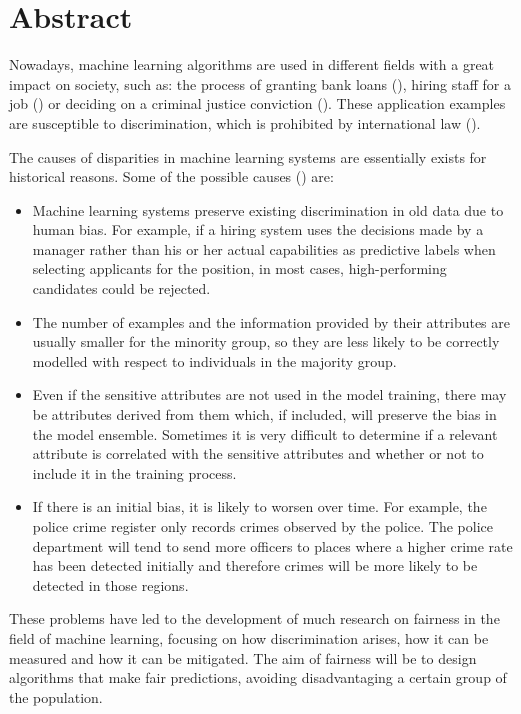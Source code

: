 \chapter*{Abstract}

Nowadays, machine learning algorithms are used in different fields with a great impact on society, such as: the process of granting bank loans (\cite{prestamo2018}), hiring staff for a job (\cite{contratar2015}) or deciding on a criminal justice conviction (\cite{condena2016}). These application examples are susceptible to discrimination, which is prohibited by international law (\cite{ley1964}).

The causes of disparities in machine learning systems are essentially exists for historical reasons. Some of the possible causes (\cite{bigdata2016}) are:

\begin{itemize}
    \item Machine learning systems preserve existing discrimination in old data due to human bias. For example, if a hiring system uses the decisions made by a manager rather than his or her actual capabilities as predictive labels when selecting applicants for the position, in most cases, high-performing candidates could be rejected.
    \item The number of examples and the information provided by their attributes are usually smaller for the minority group, so they are less likely to be correctly modelled with respect to individuals in the majority group.
    \item Even if the sensitive attributes are not used in the model training, there may be attributes derived from them which, if included, will preserve the bias in the model ensemble. Sometimes it is very difficult to determine if a relevant attribute is correlated with the sensitive attributes and whether or not to include it in the training process.
    \item If there is an initial bias, it is likely to worsen over time. For example, the police crime register only records crimes observed by the police. The police department will tend to send more officers to places where a higher crime rate has been detected initially and therefore crimes will be more likely to be detected in those regions. \vspace{2mm}
\end{itemize}

These problems have led to the development of much research on fairness in the field of machine learning, focusing on how discrimination arises, how it can be measured and how it can be mitigated. The aim of fairness will be to design algorithms that make fair predictions, avoiding disadvantaging a certain group of the population.

